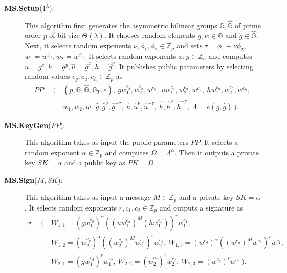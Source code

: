 \documentclass[11pt,letterpaper]{article}
\newcommand{\G}{\mathbb{G}}
\newcommand{\Z}{\mathbb{Z}}
\newcommand{\tb}[1]{\textbf{#1}}
\begin{document}
\begin{description}
\item [\tb{MS.Setup}($1^\lambda$):] This algorithm first generates the
    asymmetric bilinear groups $\G, \hat{\G}$ of prime order $p$ of bit
    size $\Theta(\lambda)$. It chooses random elements $g, w \in \G$ and
    $\hat{g} \in \hat{\G}$. Next, it selects random exponents $\nu, \phi_1,
    \phi_2 \in \Z_p$ and sets $\tau = \phi_1 + \nu \phi_2$, $w_1 =
    w^{\phi_1}, w_2 = w^{\phi_2}$. It selects random exponents $x, y \in
    \Z_n$ and computes $u = g^x, h = g^y, \hat{u} = \hat{g}^x, \hat{h} =
    \hat{g}^y$. It publishes public parameters by selecting random values
    $c_g, c_u, c_h \in \Z_p$ as
    \begin{align*}
    PP = \Big(~
    &   (p, \G, \hat{\G}, \G_T, e),~
        g w_1^{c_g}, w_2^{c_g}, w^{c_g},~
        u w_1^{c_u}, w_2^{c_u}, w^{c_u},~
        h w_1^{c_h}, w_2^{c_h}, w^{c_h},~ \\
    &   w_1, w_2, w,~
        \hat{g}, \hat{g}^{\nu}, \hat{g}^{-\tau},~
        \hat{u}, \hat{u}^{\nu}, \hat{u}^{-\tau},~
        \hat{h}, \hat{h}^{\nu}, \hat{h}^{-\tau},~
        \Lambda = e(g, \hat{g})
    ~\Big).
    \end{align*}

\item [\tb{MS.KeyGen}($PP$):] This algorithm takes as input the public
    parameters $PP$. It selects a random exponent $\alpha \in \Z_p$ and
    computes $\Omega = \Lambda^{\alpha}$. Then it outputs a private key $SK
    = \alpha$ and a public key as $PK = \Omega$.

\item [\tb{MS.Sign}($M, SK$):] This algorithm takes as input a message $M
    \in \Z_p$ and a private key $SK = \alpha$. It selects random exponents
    $r, c_1, c_2 \in \Z_p$ and outputs a signature as
    \begin{align*}
    \sigma = \Big(~
    &   W_{1,1} = (g w_1^{c_g})^{\alpha} ((u w_1^{c_u})^M (h w_1^{c_h}))^r
                  w_1^{c_1},~ \\
    &   W_{1,2} = (w_2^{c_g})^{\alpha} ((w_2^{c_u})^M w_2^{c_h})^r w_2^{c_1},~
        W_{1,3} = (w^{c_g})^{\alpha} ((w^{c_u})^M w^{c_h})^r w^{c_1},~ \\
    &   W_{2,1} = (g w_1^{c_g})^r w_1^{c_2},~
        W_{2,2} = (w_2^{c_g})^r w_2^{c_2},~
        W_{2,3} = (w^{c_g})^r w^{c_2}
    ~\Big).
    \end{align*}


\end{description}
\end{document}

